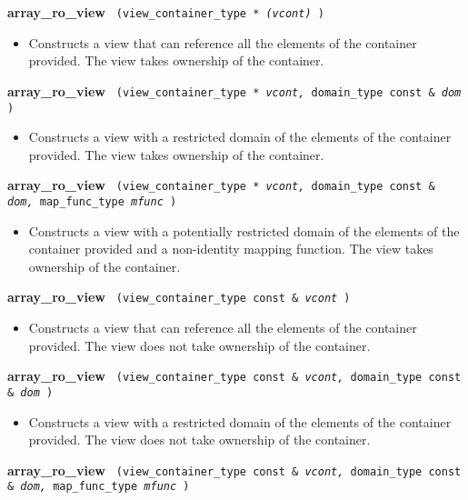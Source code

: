 \noindent
\textbf{array\_ro\_view}%
\texttt{%
(view\_container\_type *
\textit{(vcont)}%
)
}

\begin{itemize}
\item
Constructs a view that can reference all the elements of the container provided. The view takes ownership of the container.
\end{itemize}

\noindent
\textbf{array\_ro\_view}%
\texttt{%
(view\_container\_type *
\textit{vcont,}%
domain\_type const \&
\textit{dom}%
)
}

\begin{itemize}
\item
Constructs a view with a restricted domain of the elements of the container provided. The view takes ownership of the container.
\end{itemize}

\noindent
\textbf{array\_ro\_view}%
\texttt{%
(view\_container\_type *
\textit{vcont,}%
domain\_type const \&
\textit{dom,}%
    map\_func\_type
\textit{mfunc}%
)
}

\begin{itemize}
\item
Constructs a view with a potentially restricted domain of the elements of the container provided and a non-identity mapping function. The view takes ownership of the container.
\end{itemize}

\noindent
\textbf{array\_ro\_view}%
\texttt{%
(view\_container\_type const \&
\textit{vcont}%
)
}

\begin{itemize}
\item
Constructs a view that can reference all the elements of the container provided. The view does not take ownership of the container.
\end{itemize}

\noindent
\textbf{array\_ro\_view}%
\texttt{%
(view\_container\_type const \&
\textit{vcont,}%
domain\_type const \&
\textit{dom}%
)
}

\begin{itemize}
\item
Constructs a view with a restricted domain of the elements of the container provided. The view does not take ownership of the container.
\end{itemize}

\noindent
\textbf{array\_ro\_view}%
\texttt{%
(view\_container\_type const \&
\textit{vcont,}%
domain\_type const \&
\textit{dom,}%
    map\_func\_type
\textit{mfunc}%
)
}

